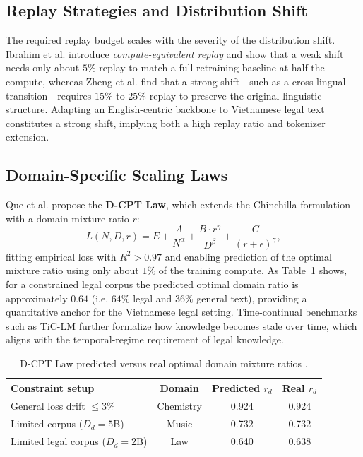 \subsection{Replay Strategies and Distribution Shift}
The required replay budget scales with the severity of the distribution shift. Ibrahim et al. \parencite{ibrahim2024simplescalablestrategiescontinually} introduce \emph{compute-equivalent replay} and show that a weak shift needs only about $5\%$ replay to match a full-retraining baseline at half the compute, whereas Zheng et al. \parencite{zheng-etal-2024-breaking} find that a strong shift---such as a cross-lingual transition---requires $15\%$ to $25\%$ replay to preserve the original linguistic structure. Adapting an English-centric backbone to Vietnamese legal text constitutes a strong shift, implying both a high replay ratio and tokenizer extension.

\subsection{Domain-Specific Scaling Laws}
Que et al. \parencite{que2024dcptlawdomainspecificcontinual} propose the \textbf{D-CPT Law}, which extends the Chinchilla formulation with a domain mixture ratio $r$:
\begin{equation}
L(N, D, r) = E + \frac{A}{N^{\alpha}} + \frac{B \cdot r^{\eta}}{D^{\beta}} + \frac{C}{(r+\epsilon)^{\gamma}} ,
\end{equation}
fitting empirical loss with $R^2 > 0.97$ and enabling prediction of the optimal mixture ratio using only about $1\%$ of the training compute. As Table~\ref{tab:dcpt} shows, for a constrained legal corpus the predicted optimal domain ratio is approximately $0.64$ (i.e. $64\%$ legal and $36\%$ general text), providing a quantitative anchor for the Vietnamese legal setting. Time-continual benchmarks such as TiC-LM \parencite{li2025ticlmwebscalebenchmarktimecontinual} further formalize how knowledge becomes stale over time, which aligns with the temporal-regime requirement of legal knowledge.

\begin{table}[H]
\centering
\small
\caption{D-CPT Law predicted versus real optimal domain mixture ratios \parencite{que2024dcptlawdomainspecificcontinual}.}
\label{tab:dcpt}
\begin{tabularx}{\textwidth}{X c c c}
\hline
\textbf{Constraint setup} & \textbf{Domain} & \textbf{Predicted $r_d$} & \textbf{Real $r_d$} \\
\hline
General loss drift $\le 3\%$ & Chemistry & 0.924 & 0.924 \\
Limited corpus ($D_d = 5\text{B}$) & Music & 0.732 & 0.732 \\
Limited legal corpus ($D_d = 2\text{B}$) & Law & 0.640 & 0.638 \\
\hline
\end{tabularx}
\end{table}

